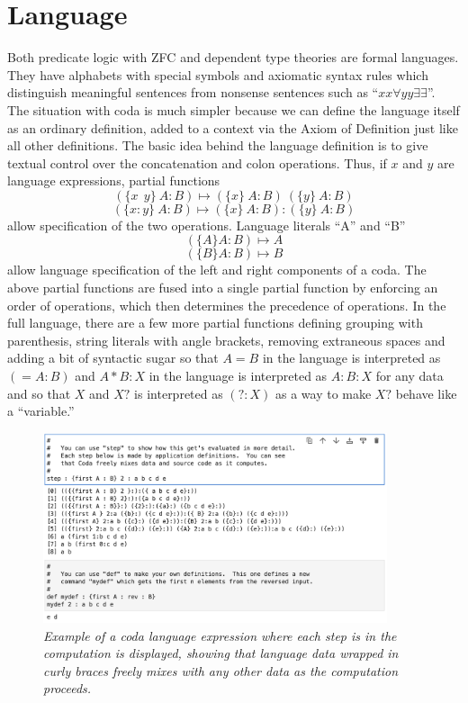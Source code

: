 \documentclass[11pt]{article}
\begin{document}
\section{Language}

Both predicate logic with ZFC and dependent type theories are formal languages.  They have alphabets with special symbols 
and axiomatic syntax rules which 
distinguish meaningful sentences from nonsense sentences such as ``$xx\forall yy\exists\exists$''.  The situation with coda is 
much simpler because we can define the language itself as an ordinary definition, added to a context via the Axiom of Definition just 
like all other definitions.  The basic idea behind the language definition is to give textual control over the concatenation and colon operations.
Thus, if $x$ and $y$ are language expressions, partial functions 
\begin{equation} \label{eqn} 
( \{x\ \ y\} \ A : B ) \mapsto (\{x\}\ A : B)\ (\{y\}\ A : B)
\end{equation} 
\begin{equation} \label{eqn} 
( \{x : y\} \ A : B ) \mapsto (\{x\}\ A : B):(\{y\}\ A : B) 
\end{equation} 
allow specification of the two operations.  Language literals ``A'' and ``B'' 
\begin{equation}\label{eqn}
(\{A\} A:B)\mapsto A
\end{equation}
\begin{equation}\label{eqn}
(\{B\} A:B)\mapsto B
\end{equation}
allow language specification of the left and right components of a coda.
The above partial functions are fused into a single partial function by enforcing an order of operations, which then determines the precedence of operations.  
In the full language, there are a few more partial functions defining grouping with parenthesis, string literals with angle brackets, 
removing extraneous spaces and adding a bit of syntactic sugar so that $A=B$ in the language is interpreted 
as $(= A:B)$ and $A*B:X$ in the language is interpreted as $A:B:X$ for any data and so that $X$ and $X?$ is interpreted as $(?:X)$ as a way to make 
$X?$ behave like a ``variable.'' 
\begin{figure}[h]
\centering
\includegraphics[width=0.9\textwidth]{language_examples.png}
\caption{{\it Example of a coda language expression where each step is in the computation is displayed, showing that language data wrapped 
in curly braces freely mixes with any other data as the computation proceeds.}}
\end{figure} 
\end{document}
